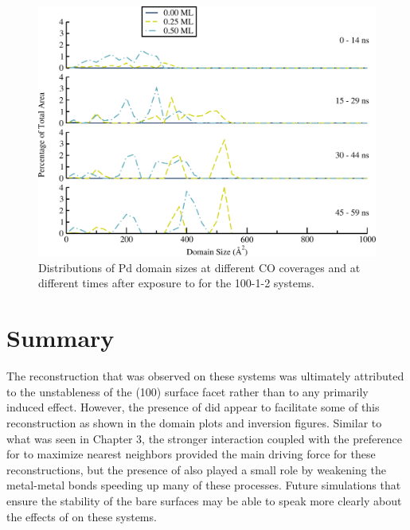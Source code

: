 \begin{figure}[p!]
\centering
  \includegraphics[width=\linewidth]{../figures/appC/ds_100_1Pt_2Pd_Pd.pdf}
  \caption{Distributions of Pd domain sizes at different CO coverages and at
different times after exposure to  for the 100-1-2
systems.}
\label{fig:ds100Pt}
\end{figure}

\section{Summary}
The reconstruction that was observed on these systems was ultimately attributed
to the unstableness of the (100) surface facet rather than to any primarily
 induced effect. However, the presence of  did appear to
facilitate some of this reconstruction as shown in the domain plots and
inversion figures. Similar to what was seen in Chapter 3, the stronger
 interaction coupled with the preference for  to
maximize nearest neighbors provided the main driving force for these
reconstructions, but the presence of  also played a small role by
weakening the metal-metal bonds speeding up many of these processes. Future
simulations that ensure the stability of the bare surfaces may be able to speak
more clearly about the effects of  on these systems.

